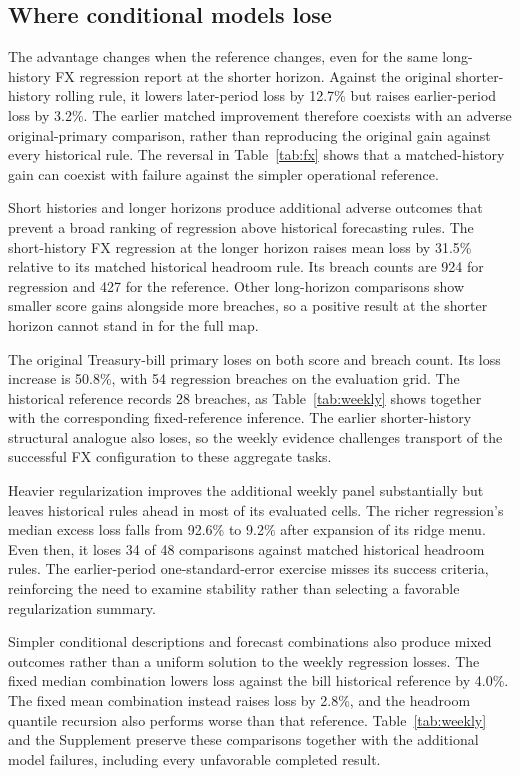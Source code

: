\documentclass[11pt,a4paper]{article}
\begin{document}
\subsection{Where conditional models lose}

The advantage changes when the reference changes, even for the same long-history FX regression report at the shorter horizon. Against the original shorter-history rolling rule, it lowers later-period loss by 12.7\% but raises earlier-period loss by 3.2\%. The earlier matched improvement therefore coexists with an adverse original-primary comparison, rather than reproducing the original gain against every historical rule. The reversal in Table~\ref{tab:fx} shows that a matched-history gain can coexist with failure against the simpler operational reference.


Short histories and longer horizons produce additional adverse outcomes that prevent a broad ranking of regression above historical forecasting rules. The short-history FX regression at the longer horizon raises mean loss by 31.5\% relative to its matched historical headroom rule. Its breach counts are 924 for regression and 427 for the reference. Other long-horizon comparisons show smaller score gains alongside more breaches, so a positive result at the shorter horizon cannot stand in for the full map.


The original Treasury-bill primary loses on both score and breach count. Its loss increase is 50.8\%, with 54 regression breaches on the evaluation grid. The historical reference records 28 breaches, as Table~\ref{tab:weekly} shows together with the corresponding fixed-reference inference. The earlier shorter-history structural analogue also loses, so the weekly evidence challenges transport of the successful FX configuration to these aggregate tasks.


Heavier regularization improves the additional weekly panel substantially but leaves historical rules ahead in most of its evaluated cells. The richer regression's median excess loss falls from 92.6\% to 9.2\% after expansion of its ridge menu. Even then, it loses 34 of 48 comparisons against matched historical headroom rules. The earlier-period one-standard-error exercise misses its success criteria, reinforcing the need to examine stability rather than selecting a favorable regularization summary.


Simpler conditional descriptions and forecast combinations also produce mixed outcomes rather than a uniform solution to the weekly regression losses. The fixed median combination lowers loss against the bill historical reference by 4.0\%. The fixed mean combination instead raises loss by 2.8\%, and the headroom quantile recursion also performs worse than that reference. Table~\ref{tab:weekly} and the Supplement preserve these comparisons together with the additional model failures, including every unfavorable completed result.
\end{document}
